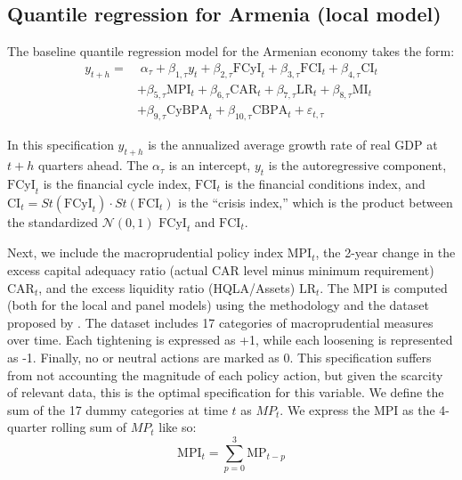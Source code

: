 \subsection{Quantile regression for Armenia (local model)}
The baseline quantile regression model for the Armenian economy takes the form:
\begin{equation}
    \label{eq:local_qr}
    \begin{aligned}
    y_{t+h} = 
    &\;\alpha_\tau + \beta_{1, \tau}y_t + \beta_{2, \tau}\text{FCyI}_t + \beta_{3, \tau}\text{FCI}_t + \beta_{4, \tau}\text{CI}_t \\
    &+ \beta_{5, \tau}\text{MPI}_t + \beta_{6, \tau}\text{CAR}_t + \beta_{7, \tau}\text{LR}_t + \beta_{8, \tau}\text{MI}_t \\
    &+ \beta_{9, \tau}\text{CyBPA}_t + \beta_{10, \tau}\text{CBPA}_t + \varepsilon_{t, \tau}
    \end{aligned}
\end{equation}

In this specification $y_{t+h}$ is the annualized average growth rate of real GDP at $t+h$ quarters ahead. The $\alpha_\tau$ is an intercept, $y_t$ is the autoregressive component, $\text{FCyI}_t$ is the financial cycle index, $\text{FCI}_t$ is the financial conditions index, and $\text{CI}_t = St(\text{FCyI}_t) \cdot St(\text{FCI}_t)$ is the “crisis index,” which is the product between the standardized $\mathcal{N}(0, 1)$ $\text{FCyI}_t$ and $\text{FCI}_t$.

Next, we include the macroprudential policy index $\text{MPI}_t$, the 2-year change in the excess capital adequacy ratio (actual CAR level minus minimum requirement) $\text{CAR}_t$, and the excess liquidity ratio (HQLA/Assets) $\text{LR}_t$. The MPI is computed (both for the local and panel models) using the methodology and the dataset proposed by \citet{alam2019}. The dataset includes 17 categories of macroprudential measures over time. Each tightening is expressed as +1, while each loosening is represented as -1. Finally, no or neutral actions are marked as 0. This specification suffers from not accounting the magnitude of each policy action, but given the scarcity of relevant data, this is the optimal specification for this variable. We define the sum of the 17 dummy categories at time $t$ as $MP_t$. We express the MPI as the 4-quarter rolling sum of $MP_t$ like so:
\begin{equation}
    \label{eq:local_mpi}
    \text{MPI}_t = \sum_{p=0}^{3} \text{MP}_{t-p}
\end{equation}

